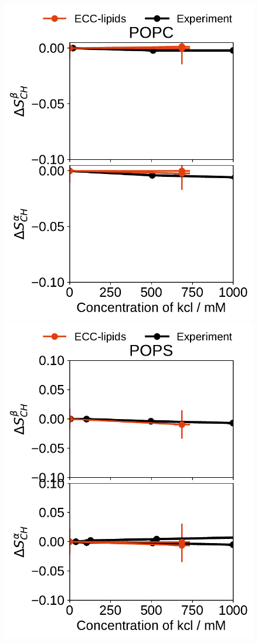 \documentclass[journal=jpcbfk,manuscript=article]{achemso}
\newlength{\figwidth}
\begin{document}
\begin{figure}[htb!] 
  \centering 
  \includegraphics[width=\figwidth]{../Fig/order_parameters_changes_A-B_POPC_kcl.pdf} 
  \includegraphics[width=\figwidth]{../Fig/order_parameters_changes_A-B_POPS_kcl.pdf} 

\end{figure}
\end{document}

